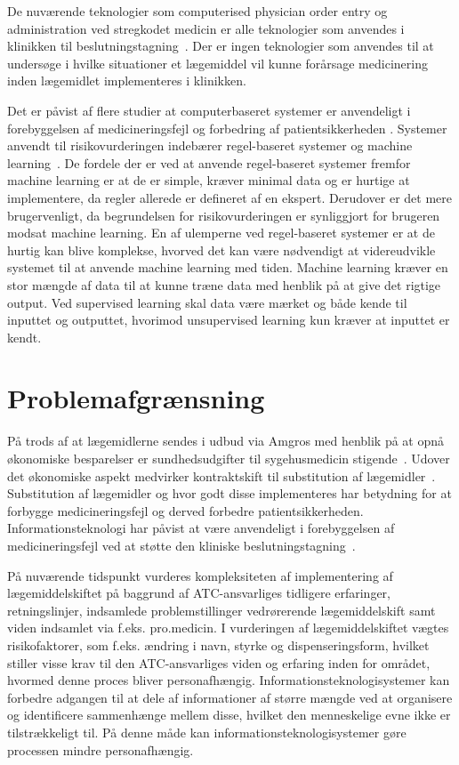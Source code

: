 De nuværende teknologier som computerised physician order entry og administration ved stregkodet medicin er alle teknologier som anvendes i klinikken til beslutningstagning~\citep{Agrawal2009, Bates2000a, Kaushal2002, Stenner2010, Fischer2008, Simpson2008}. Der er ingen teknologier som anvendes til at undersøge i hvilke situationer et lægemiddel vil kunne forårsage medicinering inden lægemidlet implementeres i klinikken.

Det er påvist af flere studier at computerbaseret systemer er anvendeligt i forebyggelsen af medicineringsfejl og forbedring af patientsikkerheden \citep{Agrawal2009, Masys2006}. Systemer anvendt til risikovurderingen indebærer regel-baseret systemer og machine learning~\citep{Geissert2018}. 
De fordele der er ved at anvende regel-baseret systemer fremfor machine learning er at de er simple, kræver minimal data og er hurtige at implementere, da regler allerede er defineret af en ekspert. Derudover er det mere brugervenligt, da begrundelsen  for risikovurderingen er synliggjort for brugeren modsat machine learning. En af ulemperne ved regel-baseret systemer er at de hurtig kan  blive komplekse, hvorved det kan være nødvendigt at videreudvikle systemet til at anvende machine learning med tiden. Machine learning kræver en stor mængde af data til at kunne træne data med henblik på at give det rigtige output. Ved supervised learning skal data være mærket og både kende til inputtet og outputtet, hvorimod unsupervised learning kun kræver at inputtet er kendt. 

\section{Problemafgrænsning}
På trods af at lægemidlerne sendes i udbud via Amgros med henblik på at opnå økonomiske besparelser er sundhedsudgifter til sygehusmedicin stigende~\citep{Sundhed2016,Sygehusapoteket2017}. Udover det økonomiske aspekt medvirker kontraktskift til substitution af lægemidler~\citep{DanskSelskabforPatientsikkerhed2009}. Substitution af lægemidler og hvor godt disse implementeres har betydning for at forbygge medicineringsfejl og derved forbedre patientsikkerheden. Informationsteknologi har påvist at være anvendeligt i forebyggelsen af medicineringsfejl ved at støtte den kliniske beslutningstagning~\citep{Agrawal2009, Anderson2002}. 

På nuværende tidspunkt vurderes kompleksiteten af implementering af lægemiddelskiftet på baggrund af ATC-ansvarliges tidligere erfaringer, retningslinjer, indsamlede problemstillinger vedrørerende lægemiddelskift samt viden indsamlet via f.eks. pro.medicin. I vurderingen af lægemiddelskiftet vægtes risikofaktorer, som f.eks. ændring i navn, styrke og dispenseringsform, hvilket stiller visse krav til den ATC-ansvarliges viden og erfaring inden for området, hvormed denne proces bliver personafhængig. Informationsteknologisystemer kan forbedre adgangen til at dele af informationer af større mængde ved at organisere og identificere sammenhænge mellem disse, hvilket den menneskelige evne ikke er tilstrækkeligt til. På denne måde kan informationsteknologisystemer gøre processen mindre personafhængig. 

